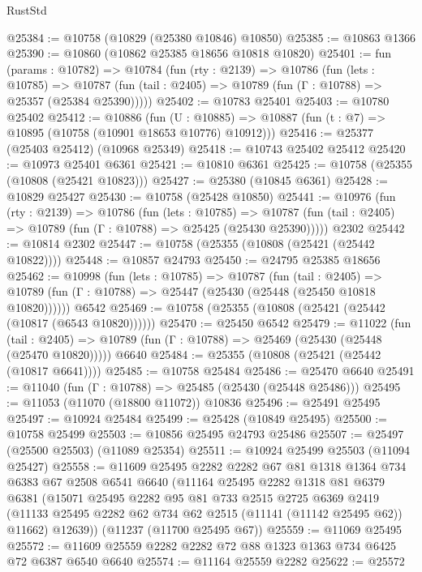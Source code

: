 \begin{lexlean}{RustStd}
\begin{coremodule}
@25384 := @10758 (@10829 (@25380 @10846) @10850)
@25385 := @10863 @1366
@25390 := @10860 (@10862 @25385 @18656 @10818 @10820)
@25401 := fun (params : @10782) =>
  @10784
    (fun (rty : @2139) =>
    @10786
      (fun (lets : @10785) =>
      @10787 (fun (tail : @2405) => @10789 (fun (Γ : @10788) => @25357 (@25384 @25390)))))
@25402 := @10783 @25401
@25403 := @10780 @25402
@25412 := @10886
    (fun (U : @10885) => @10887 (fun (t : @7) => @10895 (@10758 (@10901 @18653 @10776) @10912)))
@25416 := @25377 (@25403 @25412) (@10968 @25349)
@25418 := @10743 @25402 @25412
@25420 := @10973 @25401 @6361
@25421 := @10810 @6361
@25425 := @10758 (@25355 (@10808 (@25421 @10823)))
@25427 := @25380 (@10845 @6361)
@25428 := @10829 @25427
@25430 := @10758 (@25428 @10850)
@25441 := @10976
    (fun (rty : @2139) =>
    @10786
      (fun (lets : @10785) =>
      @10787 (fun (tail : @2405) => @10789 (fun (Γ : @10788) => @25425 (@25430 @25390)))))
    @2302
@25442 := @10814 @2302
@25447 := @10758 (@25355 (@10808 (@25421 (@25442 @10822))))
@25448 := @10857 @24793
@25450 := @24795 @25385 @18656
@25462 := @10998
    (fun (lets : @10785) =>
    @10787
      (fun (tail : @2405) =>
      @10789 (fun (Γ : @10788) => @25447 (@25430 (@25448 (@25450 @10818 @10820))))))
    @6542
@25469 := @10758 (@25355 (@10808 (@25421 (@25442 (@10817 (@6543 @10820))))))
@25470 := @25450 @6542
@25479 := @11022
    (fun (tail : @2405) => @10789 (fun (Γ : @10788) => @25469 (@25430 (@25448 (@25470 @10820)))))
    @6640
@25484 := @25355 (@10808 (@25421 (@25442 (@10817 @6641))))
@25485 := @10758 @25484
@25486 := @25470 @6640
@25491 := @11040 (fun (Γ : @10788) => @25485 (@25430 (@25448 @25486)))
@25495 := @11053 (@11070 (@18800 @11072)) @10836
@25496 := @25491 @25495
@25497 := @10924 @25484
@25499 := @25428 (@10849 @25495)
@25500 := @10758 @25499
@25503 := @10856 @25495 @24793 @25486
@25507 := @25497 (@25500 @25503) (@11089 @25354)
@25511 := @10924 @25499 @25503 (@11094 @25427)
@25558 := @11609
    @25495
    @2282
    @2282
    @67
    @81
    @1318
    @1364
    @734
    @6383
    @67
    @2508
    @6541
    @6640
    (@11164
      @25495
      @2282
      @1318
      @81
      @6379
      @6381
      (@15071
        @25495
        @2282
        @95
        @81
        @733
        @2515
        @2725
        @6369
        @2419
        (@11133 @25495 @2282 @62 @734 @62 @2515 (@11141 (@11142 @25495 @62)) @11662)
        @12639))
    (@11237 (@11700 @25495 @67))
@25559 := @11069 @25495
@25572 := @11609 @25559 @2282 @2282 @72 @88 @1323 @1363 @734 @6425 @72 @6387 @6540 @6640
@25574 := @11164 @25559 @2282
@25622 := @25572

\end{coremodule}
\end{lexlean}
